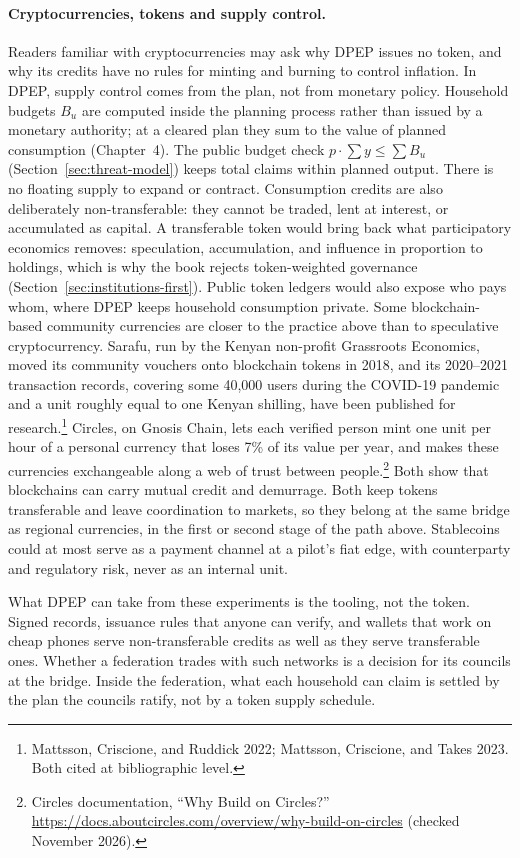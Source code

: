 \documentclass[10pt,twoside,openany]{book}
\theoremstyle{dpepstyle}
\begin{document}
\paragraph{Cryptocurrencies, tokens and supply control.} Readers familiar with cryptocurrencies may ask why DPEP issues no token, and why its credits have no rules for minting and burning to control inflation. In DPEP, supply control comes from the plan, not from monetary policy. Household budgets $B_u$ are computed inside the planning process rather than issued by a monetary authority; at a cleared plan they sum to the value of planned consumption (Chapter~4). The public budget check $p\cdot\sum y\le\sum B_u$ (Section~\ref{sec:threat-model}) keeps total claims within planned output. There is no floating supply to expand or contract. Consumption credits are also deliberately non-transferable: they cannot be traded, lent at interest, or accumulated as capital. A transferable token would bring back what participatory economics removes: speculation, accumulation, and influence in proportion to holdings, which is why the book rejects token-weighted governance (Section~\ref{sec:institutions-first}). Public token ledgers would also expose who pays whom, where DPEP keeps household consumption private. Some blockchain-based community currencies are closer to the practice above than to speculative cryptocurrency. Sarafu, run by the Kenyan non-profit Grassroots Economics, moved its community vouchers onto blockchain tokens in 2018, and its 2020--2021 transaction records, covering some 40,000 users during the COVID-19 pandemic and a unit roughly equal to one Kenyan shilling, have been published for research.\footnote{Mattsson, Criscione, and Ruddick 2022; Mattsson, Criscione, and Takes 2023. Both cited at bibliographic level.} Circles, on Gnosis Chain, lets each verified person mint one unit per hour of a personal currency that loses 7\% of its value per year, and makes these currencies exchangeable along a web of trust between people.\footnote{Circles documentation, ``Why Build on Circles?'' \url{https://docs.aboutcircles.com/overview/why-build-on-circles} (checked November 2026).} Both show that blockchains can carry mutual credit and demurrage. Both keep tokens transferable and leave coordination to markets, so they belong at the same bridge as regional currencies, in the first or second stage of the path above. Stablecoins could at most serve as a payment channel at a pilot's fiat edge, with counterparty and regulatory risk, never as an internal unit.

What DPEP can take from these experiments is the tooling, not the token. Signed records, issuance rules that anyone can verify, and wallets that work on cheap phones serve non-transferable credits as well as they serve transferable ones. Whether a federation trades with such networks is a decision for its councils at the bridge. Inside the federation, what each household can claim is settled by the plan the councils ratify, not by a token supply schedule.
\end{document}
